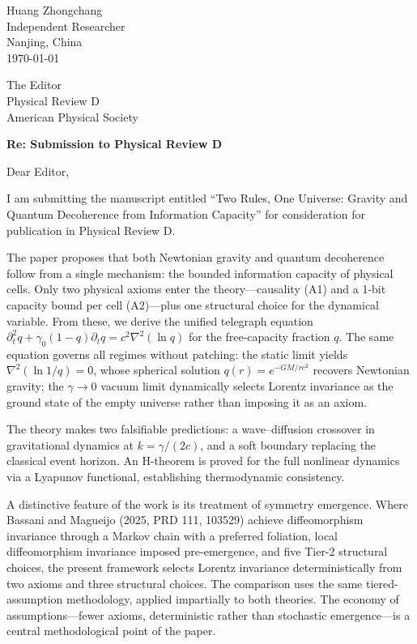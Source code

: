 \documentclass[12pt]{article}
\begin{document}
\begin{flushright}
Huang Zhongchang\\
Independent Researcher\\
Nanjing, China\\
\today
\end{flushright}

\vspace{0.3in}

\noindent
The Editor\\
Physical Review D\\
American Physical Society

\vspace{0.2in}

\noindent
\textbf{Re: Submission to Physical Review D}

\vspace{0.1in}

\noindent
Dear Editor,

\vspace{0.1in}

I am submitting the manuscript entitled ``Two Rules, One Universe: Gravity and Quantum Decoherence from Information Capacity'' for consideration for publication in Physical Review D.

The paper proposes that both Newtonian gravity and quantum decoherence follow from a single mechanism: the bounded information capacity of physical cells. Only two physical axioms enter the theory---causality (A1) and a 1-bit capacity bound per cell (A2)---plus one structural choice for the dynamical variable. From these, we derive the unified telegraph equation
$\partial_t^2 q + \gamma_0(1-q)\partial_t q = c^2\nabla^2(\ln q)$
for the free-capacity fraction $q$. The same equation governs all regimes without patching: the static limit yields $\nabla^2(\ln 1/q)=0$, whose spherical solution $q(r)=e^{-GM/rc^2}$ recovers Newtonian gravity; the $\gamma\to0$ vacuum limit dynamically selects Lorentz invariance as the ground state of the empty universe rather than imposing it as an axiom.

The theory makes two falsifiable predictions: a wave--diffusion crossover in gravitational dynamics at $k=\gamma/(2c)$, and a soft boundary replacing the classical event horizon. An H-theorem is proved for the full nonlinear dynamics via a Lyapunov functional, establishing thermodynamic consistency.

A distinctive feature of the work is its treatment of symmetry emergence. Where Bassani and Magueijo (2025, PRD 111, 103529) achieve diffeomorphism invariance through a Markov chain with a preferred foliation, local diffeomorphism invariance imposed pre-emergence, and five Tier-2 structural choices, the present framework selects Lorentz invariance deterministically from two axioms and three structural choices. The comparison uses the same tiered-assumption methodology, applied impartially to both theories. The economy of assumptions---fewer axioms, deterministic rather than stochastic emergence---is a central methodological point of the paper.
\end{document}
